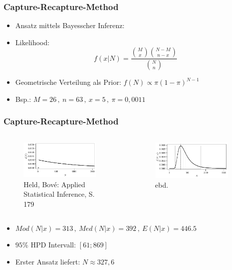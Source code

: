 \documentclass[aspectratio=169,xcolor=dvipsnames]{beamer}
\begin{document}
\begin{frame}
\frametitle{Capture-Recapture-Method}
\begin{itemize}
	\item<1-> Ansatz mittels Bayesscher Inferenz:
	\item<2-> Likelihood: $$f(x|N)=\frac{\binom{M}{x}\binom{N-M}{n-x}}{\binom{N}{n}}$$
	\item<3-> Geometrische Verteilung als Prior: $f(N)\propto \pi(1-\pi)^{N-1}$
	\item<4-> Bsp.: $M=26\, ,~n=63\, ,~x=5\, ,~\pi=0,0011$
\end{itemize}
\end{frame}

\begin{frame}
\frametitle{Capture-Recapture-Method}
\begin{columns}
	\begin{column}{0.5\textwidth}
		\begin{figure}
			\includegraphics[width=0.9\textwidth]{geom}
			\caption{Held, Bov\'{e}: Applied Statistical Inference, S. 179}
		\end{figure}
	\end{column}
	\begin{column}{0.5\textwidth}
		\begin{figure}
			\includegraphics[width=0.9\textwidth]{capture-recapture}
			\caption{ebd.}
		\end{figure}
	\end{column}
\end{columns}
\begin{itemize}
	\item<1-> $Mod(N|x)=313\, ,~Med(N|x)=392\, ,~E(N|x)=446.5$
	\item<2-> $95\%$ HPD Intervall: $[61; 869]$
	\item<3-> Erster Ansatz liefert: $N\approx 327,6$
\end{itemize}
\end{frame}
\end{document}
